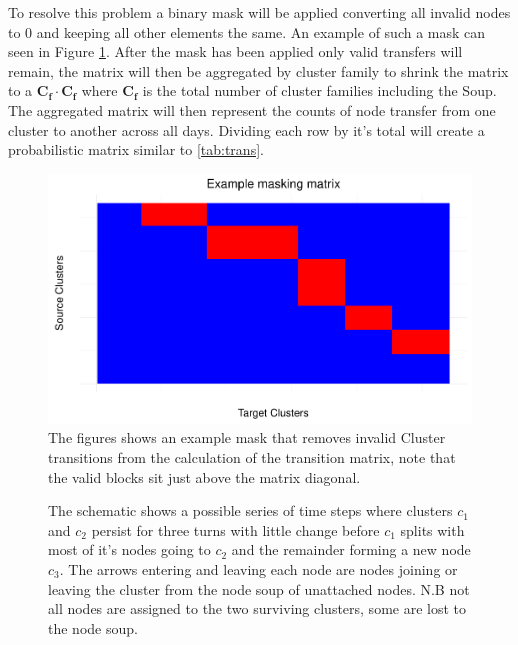 To resolve this problem a binary mask will be applied converting all invalid nodes to 0 and keeping all other elements the same. An example of such a mask can seen in Figure \ref{fig:ClusterMask}. After the mask has been applied only valid transfers will remain, the matrix will then be aggregated by cluster family to shrink the matrix to a $\mathbf{C_f} \cdot \mathbf{C_f}$ where $\mathbf{C_f}$ is the total number of cluster families including the Soup. The aggregated matrix will then represent the counts of node transfer from one cluster to another across all days. Dividing each row by it's total will create a probabilistic matrix similar to \ref{tab:trans}.

\begin{figure}
    \centering
    \includegraphics[width = \textwidth]{Figures/Method/ClusterMask}
    \caption[Cluster Transition Mask]{The figures shows an example mask that removes invalid Cluster transitions from the calculation of the transition matrix, note that the valid blocks sit just above the matrix diagonal. }
    \label{fig:ClusterMask}
\end{figure}

\begin{figure}[ht]
\centering
  
  \caption[Cluster Continuation. Merge and Split]{The schematic shows a possible series of time steps where clusters $c_1$ and $c_2$ persist for three turns with little change before $c_1$ splits with most of it's nodes going to $c_2$ and the remainder forming a new node $c_3$. The arrows entering and leaving each node are nodes joining or leaving the cluster from the node soup of unattached nodes. N.B not all nodes are assigned to the two surviving clusters, some are lost to the node soup.}
  \label{fig:contmergsplit}
\end{figure}


